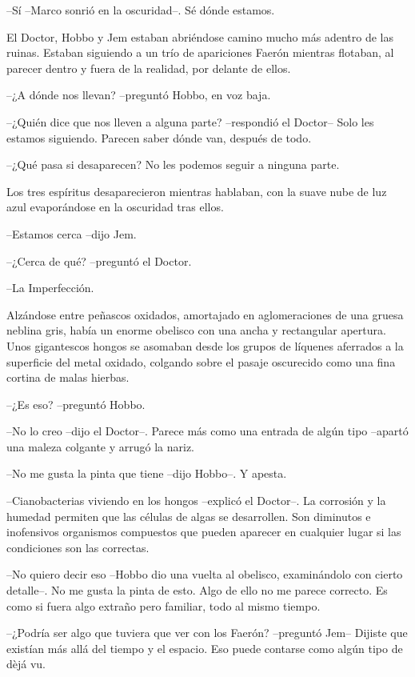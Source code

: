 {--Sí --Marco sonrió en la oscuridad--. Sé dónde
 estamos.}

{El Doctor, Hobbo y Jem estaban abriéndose
 camino mucho más adentro de las ruinas. Estaban siguiendo a un trío de
 apariciones Faerón mientras flotaban, al parecer dentro y fuera de la
realidad, por delante de ellos.}

{--¿A dónde nos llevan? --preguntó Hobbo, en voz baja.}

{--¿Quién dice que nos lleven a alguna parte? --respondió el Doctor--
Solo les estamos siguiendo. Parecen saber dónde van, después de todo.}

{--¿Qué pasa si desaparecen? No les podemos seguir a ninguna parte.}

{Los tres espíritus desaparecieron mientras hablaban, con la suave nube
de luz azul evaporándose en la oscuridad tras ellos.}

{--Estamos cerca --dijo Jem.}

{--¿Cerca de qué? --preguntó el Doctor.}

{--La Imperfección.}

{Alzándose entre peñascos oxidados, amortajado en aglomeraciones de una
 gruesa neblina gris, había un enorme obelisco con una ancha y
 rectangular apertura. Unos gigantescos hongos se asomaban desde los
 grupos de líquenes aferrados a la superficie del metal oxidado, colgando
sobre el pasaje oscurecido como una fina cortina de malas hierbas.}

{--¿Es eso? --preguntó Hobbo.}

{--No lo creo --dijo el Doctor--. Parece más como una entrada de algún
tipo --apartó una maleza colgante y arrugó la nariz.}

{--No me gusta la pinta que tiene --dijo Hobbo--. Y apesta.}

{--Cianobacterias viviendo en los hongos --explicó el Doctor--. La
 corrosión y la humedad permiten que las células de algas se desarrollen.
 Son diminutos e inofensivos organismos compuestos que pueden aparecer en
cualquier lugar si las condiciones son las correctas.}

{--No quiero decir eso --Hobbo dio una vuelta al obelisco, examinándolo
 con cierto detalle--. No me gusta la pinta de esto. Algo de ello no me
 parece correcto. Es como si fuera algo extraño pero familiar, todo al
mismo tiempo.}

{--¿Podría ser algo que tuviera que ver con los Faerón? --preguntó Jem--
 Dijiste que existían más allá del tiempo y el espacio. Eso puede
contarse como algún tipo de dèjá vu.}

